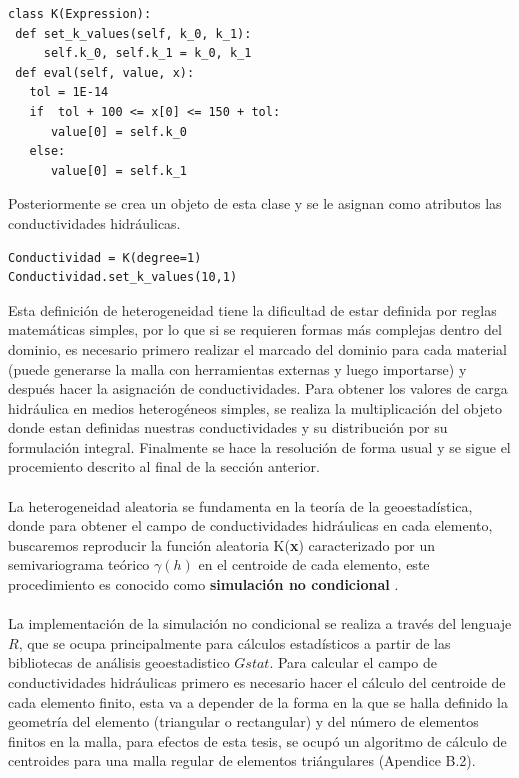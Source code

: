 \lstset{language=python,breaklines=true, basicstyle=\footnotesize}
\begin{lstlisting}[frame=single]
class K(Expression):
 def set_k_values(self, k_0, k_1):
     self.k_0, self.k_1 = k_0, k_1
 def eval(self, value, x):
   tol = 1E-14 
   if  tol + 100 <= x[0] <= 150 + tol:
      value[0] = self.k_0
   else:
      value[0] = self.k_1
\end{lstlisting}

Posteriormente se crea un objeto de esta clase y se le asignan como atributos las conductividades hidráulicas. 

\lstset{language=python,breaklines=true, basicstyle=\footnotesize}
\begin{lstlisting}[frame=single]
Conductividad = K(degree=1)
Conductividad.set_k_values(10,1)
\end{lstlisting}

Esta definición de heterogeneidad tiene la dificultad de estar definida por reglas matemáticas simples, por lo que si se requieren formas más complejas dentro del dominio, es necesario primero realizar el marcado del dominio para cada material (puede generarse la malla con herramientas externas y luego importarse) y después hacer la asignación de conductividades. Para obtener los valores de carga hidráulica en medios heterogéneos simples, se realiza la multiplicación del objeto donde estan definidas nuestras conductividades y su distribución por su formulación integral. Finalmente se hace la resolución de forma usual y se sigue el procemiento descrito al final de la sección anterior.
\\
\\
La heterogeneidad aleatoria se fundamenta en la teoría de la geoestadística, donde para obtener el campo de conductividades hidráulicas en cada elemento, buscaremos reproducir la función aleatoria K(\textbf{x}) caracterizado por un semivariograma teórico $\gamma(h)$ en el centroide de cada elemento, este procedimiento es conocido como \textbf{simulación no condicional} \cite{Quintin2000}.
\\
\\
La implementación de la simulación no condicional se realiza a través del lenguaje $\textit{R}$, que se ocupa principalmente para cálculos estadísticos a partir de las bibliotecas de análisis geoestadistico $\textit{Gstat}$. Para calcular el campo de conductividades hidráulicas primero es necesario hacer el cálculo del centroide de cada elemento finito, esta va a depender de la forma en la que se halla definido la geometría del elemento (triangular o rectangular) y del número de elementos finitos en la malla, para efectos de esta tesis, se ocupó un algoritmo de cálculo de centroides para una malla regular de elementos triángulares (Apendice B.2)\cite{Beer2010}. 

